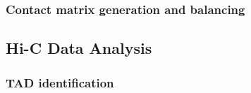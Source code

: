
\subsubsection{Contact matrix generation and balancing}



\subsection{Hi-C Data Analysis}

\subsubsection{TAD identification}



